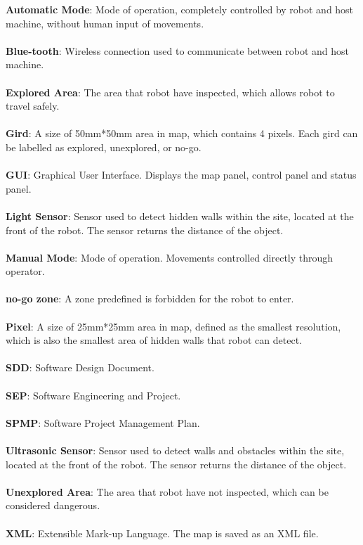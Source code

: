 \documentclass[11pt, a4paper]{report}
\begin{document}
\textbf{Automatic Mode}:  Mode of operation, completely controlled by robot and host machine, without human input of movements. \\
\\ \textbf{Blue-tooth}: Wireless connection used to communicate between robot and host machine.\\
\\ \textbf{Explored Area}: The area that robot have inspected, which allows robot to travel safely.  \\
\\ \textbf{Gird}: A size of 50mm*50mm area in map, which contains 4 pixels. Each gird can be labelled as explored, unexplored, or no-go.\\
\\ \textbf{GUI}: Graphical User Interface. Displays the map panel, control panel and status panel.\\
\\ \textbf{Light Sensor}: Sensor used to detect hidden walls within the site, located at the front of the robot. The sensor returns the distance of the object.\\
\\ \textbf{Manual Mode}: Mode of operation. Movements controlled directly through operator.\\
\\ \textbf{no-go zone}: A zone predefined is forbidden for the robot to enter. \\
\\ \textbf{Pixel}: A size of 25mm*25mm area in map, defined as the smallest resolution, which is also the smallest area of hidden walls that robot can detect.  \\
\\ \textbf{SDD}: Software Design Document.\\
\\ \textbf{SEP}: Software Engineering and Project.\\
\\ \textbf{SPMP}: Software Project Management Plan.\\
\\ \textbf{Ultrasonic Sensor}: Sensor used to detect walls and obstacles within the site, located at the front of the robot. The sensor returns the distance of the object.\\
\\ \textbf{Unexplored Area}: The area that robot have not inspected, which can be considered dangerous.  \\
\\ \textbf{XML}: Extensible Mark-up Language. The map is saved as an XML file.\\
\end{document}
